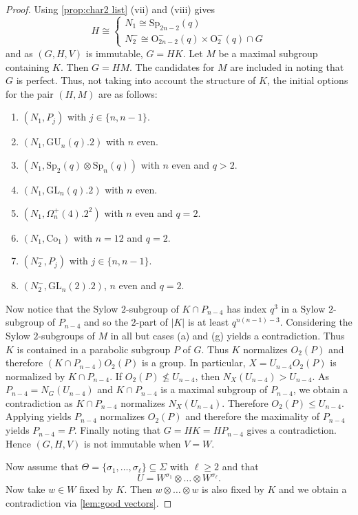 \documentclass[12pt]{amsart}
\theoremstyle{remark}
\theoremstyle{notation}
\theoremstyle{definition}
\newcommand{\GL}{\mathrm{GL}}
\newcommand{\Sp}{\mathrm{Sp}}
\newcommand{\GU}{\mathrm{GU}}
\newcommand{\0}{\emptyset}
\begin{document}
\begin{proof}
Using  \cref{prop:char2 list} (vii) and (viii) gives
$$H \cong \begin{cases} N_1\cong \Sp_{2n-2}(q)\\N_2^- \cong  \mathrm O_{2n-2}^-(q)\times \mathrm O_2^-(q) \cap G \end{cases}$$ and as $(G,H,V)$ is immutable, $G= HK$. Let $M$ be a maximal subgroup containing $K$.  Then $G= HM$.  The candidates for $M$ are included in \cite[Theorem A, Tables 1 \& 2  ]{LiebeckPraegerSaxl} noting that $G$ is perfect. Thus, not taking into account the structure of $K$, the initial options for the pair $(H,M)$ are as follows:
\begin{enumerate}
\item[(a)] $(N_1,P_j)$ with $j \in \{n,n-1\}$.
\item[(b)] $(N_1,{} \GU_n(q).2)$ with $n$ even.
\item[(c)] $(N_1,\Sp_2(q) \otimes \Sp_n(q))$ with $n$ even and $q> 2$.
\item[(d)] $(N_1, \GL_n(q).2)$  with $n$ even.
\item[(e)]  $(N_1,\Omega_n^+(4).2^2)$ with $n$ even and $q=2$.
    \item[(f)]  $(N_1,\mathrm{Co}_1)$ with $n=12$   and $q=2$.
 
 \item[(g)]  $(N_2^- ,P_j)$ with $j \in \{n,n-1\}$.
 \item[(h)] $(N_2^-, \GL_n(2).2)$, $n$ even and $q=2$.
      \end{enumerate}



      Now notice that the Sylow $2$-subgroup of $K\cap P_{n-4}$ has index $q^3$ in a Sylow $2$-subgroup of $P_{n-4}$ and so the $2$-part of $|K|$ is at least $q^{n(n-1)-3}$.  Considering the Sylow $2$-subgroups of $M$ in all but cases (a) and (g) yields a contradiction. Thus $K$ is contained in a parabolic subgroup $P$ of $G$.    Thus $K$ normalizes $O_2(P)$ and therefore $(K\cap P_{n-4})O_2(P)$ is a group. In particular, $X=U_{n-4}O_2(P) $ is normalized by $K\cap P_{n-4}$. If $O_2(P) \not \le U_{n-4}$, then $N_X(U_{n-4})>U_{n-4}$. As $P_{n-4}= N_G(U_{n-4})$ and $K\cap P_{n-4}$ is a maximal subgroup of $ P_{n-4}$, we obtain a  contradiction as $K \cap P_{n-4}$ normalizes $N_X(U_{n-4})$. Therefore $O_2(P) \le U_{n-4}$. Applying  \cite[Lemma 4.2]{Grodal}   yields $P_{n-4}$ normalizes $O_2(P)$ and therefore the maximality of $P_{n-4}$ yields $P_{n-4}= P$.  Finally noting that $G= HK= HP_{n-4}$  gives a contradiction. Hence $(G,H,V)$ is not immutable when $V=W$.



 Now assume that $\Theta=\{\sigma_1, \dots, \sigma_\ell\}\subseteq \Sigma$ with $\ell \ge 2$ and that $$U= W^{\sigma_1}\otimes\dots \otimes W^{\sigma_\ell}.$$
Now take $w\in W$ fixed by $K$. Then $w\otimes \dots \otimes w$ is also fixed by $K$ and we obtain a contradiction via \cref{lem:good vectors}.
\end{proof}
\end{document}
